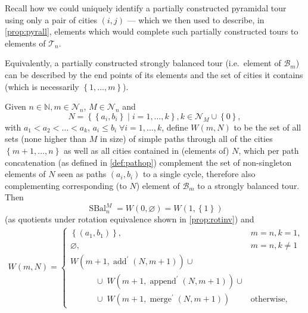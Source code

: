 \documentclass[index=totoc,bibliography=totoc]{scrartcl}
\newcommand{\annotation}[1]{\marginpar{\small\itshape\color{green}#1}}
\numberwithin{equation}{section}
\numberwithin{figure}{section}
\numberwithin{table}{section}
\begin{document}
Recall how we could uniquely identify a partially constructed pyramidal
tour using only a pair of cities $(i,j)$ --- which we then used to
describe, in \cref{prop:pyrall}, elements which would complete such
partially constructed tours to elements of $\mathcal{T}_n$.

Equivalently, a partially constructed strongly balanced tour (i.e.\ element
of $\mathcal{B}_m$) can be described by the end points of its elements and
the set of cities it contains (which is necessarily $\left\{1,\ldots,m\right\}$).

\begin{proposition}
\label{prop:sball}
  Given $n \in \mathbb{N}, m \in \mathcal{N}_n$, $M \in \mathcal{N}_n$
  and
  \[
    N = \left\{\left\{a_i,b_i\right\} \mid i = 1,\ldots,k \right\}, k \in \mathcal{N}_M \cup \left\{0\right\},
  \]
  with $a_1 < a_2 < \ldots < a_k$, $a_i \leq b_i \; \forall i = 1,\ldots,k$,
  define $W\left(m,N\right)$ to be the set of
  all sets (none higher than $M$ in size)
  of simple paths through all of the cities $\left\{m+1,\ldots,n\right\}$
  as well as all cities contained in (elements of) $N$,
  which per path concatenation (as defined in \cref{def:pathop})
  complement the set of
  non-singleton elements of $N$ seen as paths $(a_i,b_i)$ to a single cycle,
  therefore also complementing corresponding (to $N$\!) element of $\mathcal{B}_m$
  to a strongly balanced tour.
  Then
  \[
    \operatorname{SBal}_n^M =
    W\left(0,\varnothing\right) =
      W\left(1,\left\{1\right\}\right)
  \]
  (as quotients under rotation equivalence shown in \cref{prop:rotinv}) and
  \begin{align}
    \label{eq:sbdp}
    W\left(m,N\right) =
    \begin{cases}
      \left\{(a_1,b_1)\right\}, & m = n, k = 1, \\
      \varnothing, & m = n, k \neq 1 \\
      W\left(m+1,\operatorname{add}^\prime\left(N,m+1\right)\right) \cup
      \\ \quad \quad \quad
      \cup\;  W\left(m+1,\operatorname{append}^\prime\left(N,m+1\right)\right) \cup
      \\ \quad \quad \quad
      \cup\; W\left(m+1,\operatorname{merge}^\prime\left(N,m+1\right)\right) & \text{otherwise},
    \end{cases}
  \end{align}

\end{proposition}
\end{document}
